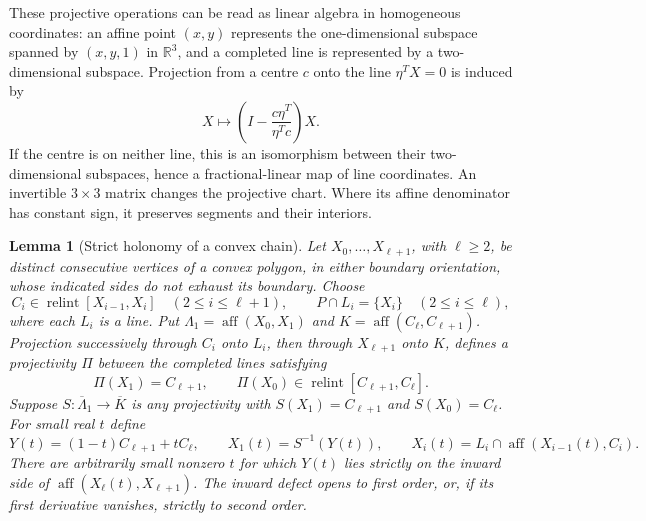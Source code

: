 \documentclass[11pt,a4paper]{article}
\newcommand{\R}{\mathbb R}
\DeclareMathOperator{\aff}{aff}
\DeclareMathOperator{\relint}{relint}
\newtheorem{lemma}[theorem]{Lemma}
\theoremstyle{definition}
\theoremstyle{remark}
\numberwithin{equation}{section}
\begin{document}
These projective operations can be read as linear algebra in homogeneous
coordinates: an affine point $(x,y)$ represents the
one-dimensional subspace spanned by $(x,y,1)$ in $\R^3$, and a completed
line is represented by a two-dimensional subspace.
Projection from a centre $c$ onto the line $\eta^TX=0$ is induced by
\[
 X\longmapsto\left(I-\frac{c\eta^T}{\eta^Tc}\right)X.
\]
If the centre is on neither line, this is an isomorphism between their
two-dimensional subspaces, hence a fractional-linear map of line coordinates.
An invertible $3\times3$ matrix changes the projective chart. Where its
affine denominator has constant sign, it preserves segments and their interiors.

\begin{lemma}[Strict holonomy of a convex chain]\label{lem:chain-holonomy}
Let $X_0,\ldots,X_{\ell+1}$, with $\ell\ge2$, be distinct consecutive vertices
of a convex polygon, in either boundary orientation, whose indicated sides
do not exhaust its boundary.  Choose
\[
 C_i\in\relint[X_{i-1},X_i]\quad(2\le i\le \ell+1),
 \qquad P\cap L_i=\{X_i\}\quad(2\le i\le \ell),
\]
where each $L_i$ is a line.  Put $\Lambda_1=\aff(X_0,X_1)$ and
$K=\aff(C_\ell,C_{\ell+1})$.  Projection successively through $C_i$ onto $L_i$,
then through $X_{\ell+1}$ onto $K$, defines a projectivity $\Pi$ between
the completed lines satisfying
\begin{equation}\label{eq:strict-holonomy}
 \Pi(X_1)=C_{\ell+1},\qquad
 \Pi(X_0)\in\relint[C_{\ell+1},C_\ell].
\end{equation}
Suppose $S:\overline\Lambda_1\to\overline K$ is any projectivity with
$S(X_1)=C_{\ell+1}$ and $S(X_0)=C_\ell$.  For small real $t$ define
\[
 Y(t)=(1-t)C_{\ell+1}+tC_\ell,\qquad X_1(t)=S^{-1}(Y(t)),
 \qquad X_i(t)=L_i\cap\aff(X_{i-1}(t),C_i).
\]
There are arbitrarily small nonzero $t$ for which $Y(t)$ lies strictly
on the inward side of $\aff(X_\ell(t),X_{\ell+1})$.  The inward defect opens
to first order, or, if its first derivative vanishes, strictly to second
order.
\end{lemma}
\end{document}
